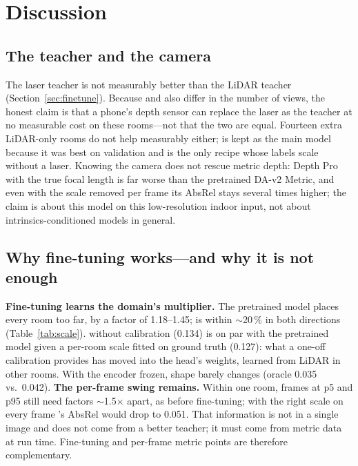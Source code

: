 \section{Discussion}\label{sec:discussion}

\subsection{The teacher and the camera}\label{sec:teacher}
The laser teacher is not measurably better than the LiDAR teacher (Section~\ref{sec:finetune}). Because \ftfaro{} and
\ftlidar{} also differ in the number of views, the honest claim is that a phone's depth sensor can replace the laser as
the teacher at no measurable cost on these rooms---not that the two are equal. Fourteen extra LiDAR-only rooms do not
help measurably either; \ftmain{} is kept as the main model because it was best on validation and is the only recipe
whose labels scale without a laser. Knowing the camera does not rescue metric depth: Depth Pro with the true focal length is
far worse than the pretrained DA-v2 Metric, and even with the scale removed per frame its AbsRel stays several times
higher; the claim is about this model on this low-resolution indoor input, not about intrinsics-conditioned models in
general.

\subsection{Why fine-tuning works---and why it is not enough}\label{sec:whyft}
\textbf{Fine-tuning learns the domain's multiplier.} The pretrained model places every room too far, by a factor of
1.18--1.45; \ftmain{} is within $\sim$20\,\% in both directions (Table~\ref{tab:scale}). \ftmain{} without calibration
(0.134) is on par with the pretrained model given a per-room scale fitted on ground truth (0.127): what a one-off
calibration provides has moved into the head's weights, learned from LiDAR in other rooms. With the encoder frozen,
shape barely changes (oracle 0.035 vs.\ 0.042).
\textbf{The per-frame swing remains.} Within one room, frames at p5 and p95 still need factors $\sim$1.5$\times$ apart,
as before fine-tuning; with the right scale on every frame \ftmain{}'s AbsRel would drop to 0.051. That information is not in
a single image and does not come from a better teacher; it must come from metric data at run time. Fine-tuning and
per-frame metric points are therefore complementary.

